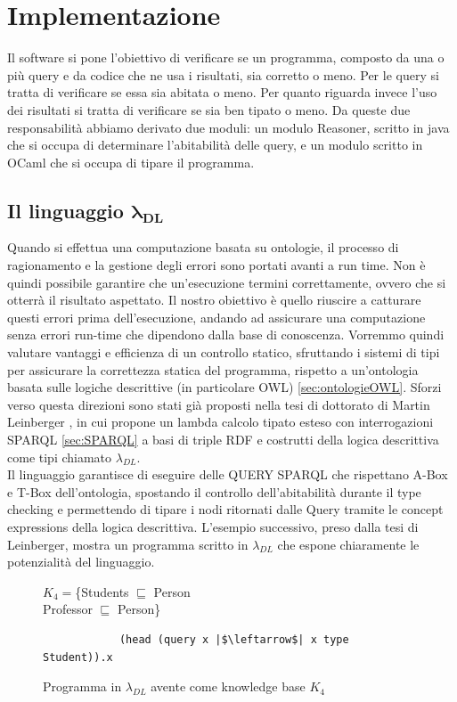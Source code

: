 \chapter[Implementazione]{Implementazione}
\label{chap:Implementazione}
Il software si pone l'obiettivo di verificare se un programma, composto da una o più query e da codice che ne usa i risultati, sia corretto o meno. Per le query si tratta di verificare se essa sia abitata o meno. Per quanto riguarda invece l'uso dei risultati si tratta di verificare se sia ben tipato o meno. Da queste due responsabilità abbiamo derivato due moduli: un modulo Reasoner, scritto in java che si occupa di determinare l'abitabilità delle query, e un modulo scritto in OCaml che si occupa di tipare il programma.

\section{Il linguaggio $\boldsymbol{\lambda_{DL}}$}
    Quando si effettua una computazione basata su ontologie, il processo di ragionamento e la gestione degli errori sono portati avanti a run time. Non è quindi possibile garantire che un'esecuzione termini correttamente, ovvero che si otterrà il risultato aspettato. 
    Il nostro obiettivo è quello riuscire a catturare questi errori prima dell'esecuzione, andando ad assicurare una computazione senza errori run-time che dipendono dalla base di conoscenza. 
    Vorremmo quindi valutare vantaggi e efficienza di un controllo statico, sfruttando i sistemi di tipi per assicurare la correttezza statica del programma, rispetto a 
    un'ontologia basata sulle logiche descrittive (in particolare OWL) \ref{sec:ontologieOWL}. Sforzi verso questa direzioni sono stati già proposti nella tesi di dottorato di Martin Leinberger \cite{leinbergerphdthesis}, 
    in cui propone un lambda calcolo tipato esteso con interrogazioni SPARQL \ref{sec:SPARQL} a basi di triple RDF e costrutti della logica descrittiva come tipi chiamato $\lambda_{DL}$.
    \\ Il linguaggio garantisce di eseguire delle QUERY SPARQL che rispettano A-Box e T-Box dell'ontologia, spostando il controllo dell'abitabilità durante il type checking e
    permettendo di tipare i nodi ritornati dalle Query tramite le concept expressions della logica descrittiva.
    L'esempio successivo, preso dalla tesi di Leinberger, mostra un programma scritto in $\lambda_{DL}$ che espone chiaramente le potenzialità del linguaggio.
    \begin{figure}[h]
        \captionsetup{singlelinecheck = false}
        $K_4 = $\{Students $\sqsubseteq$ Person
        \\Professor $\sqsubseteq$ Person\}
        \begin{verbatim}
            (head (query x |$\leftarrow$| x type Student)).x
        \end{verbatim}
        \caption{Programma in $\lambda_{DL}$ avente come knowledge base $K_4$}
    \end{figure}

